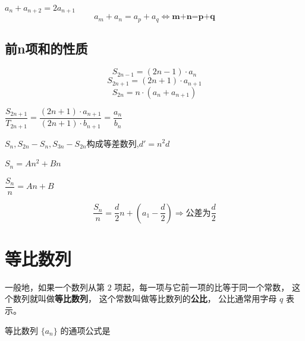 \documentclass[10pt,cn]{elegantbook}
\begin{document}
	$a_{n}+a_{n+2}=2a_{n+1}$
	$$a_{m}+a_{n}=a_{p}+a_{q} \Leftrightarrow \textbf{m+n=p+q}$$
	
	\subsection{前n项和的性质}
    
    
    $$S_{2n-1}=(2n-1)\cdot a_{n}$$
    $$S_{2n+1}=(2n+1)\cdot a_{n+1}$$
    $$S_{2n}=n\cdot (a_{n}+a_{n+1})$$
    
     
     $\dfrac{S_{2n+1}}{T_{2n+1}}=\dfrac{(2n+1)\cdot a_{n+1}}{(2n+1)\cdot b_{n+1}} = \dfrac{a_{n}}{b_{n}}$
     
     	\begin{center}
     \end{center}
     
      
      $ S_{n},S_{2n}-S_{n},S_{3n}-S_{2n}$构成等差数列,$d'=n^{2}d$
      
      
      $S_{n}=An^{2}+Bn$
      
      $\dfrac{S_{n}}{n}=An+B$
      
      $$\dfrac{S_{n}}{n}=\dfrac{d}{2}n+(a_{1}-\dfrac{d}{2}) \Rightarrow \text{公差为}\dfrac{d}{2}$$
      
      \section{等比数列}
      
      一般地，如果一个数列从第 $2$ 项起，每一项与它前一项的比等于同一个常数，
      这个数列就叫做\textbf{等比数列}， 这个常数叫做等比数列的\textbf{公比}，
      公比通常用字母 $q$ 表示。
      
      等比数列 $\{a_n\}$ 的通项公式是
      \begin{center}
      \end{center}
      
\end{document}

